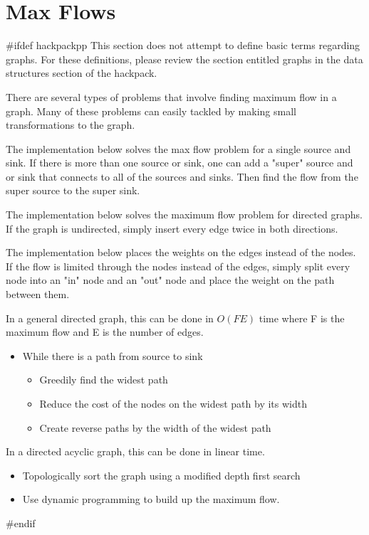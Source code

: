 \section{Max Flows}
#ifdef hackpackpp
This section does not attempt to define basic terms regarding graphs.
For these definitions, please review the section entitled graphs in the data structures section of the hackpack.


There are several types of problems that involve finding maximum flow in a graph.
Many of these problems can easily tackled by making small transformations to the graph.


The implementation below solves the max flow problem for a single source and sink.
If there is more than one source or sink, one can add a "super" source and or sink that connects to all of the sources and sinks.
Then find the flow from the super source to the super sink.


The implementation below solves the maximum flow problem for directed graphs.
If the graph is undirected, simply insert every edge twice in both directions.


The implementation below places the weights on the edges instead of the nodes.
If the flow is limited through the nodes instead of the edges, simply split every node into an "in" node and an "out" node and place the weight on the path between them.


In a general directed graph, this can be done in $O(FE)$ time where F is the maximum flow and E is the number of edges.
\begin{itemize}
	\item While there is a path from source to sink
	\begin{itemize}
		\item Greedily find the widest path
		\item Reduce the cost of the nodes on the widest path by its width
		\item Create reverse paths by the width of the widest path
	\end{itemize}
\end{itemize}

In a directed acyclic graph, this can be done in linear time.

\begin{itemize}
	\item Topologically sort the graph using a modified depth first search
	\item Use dynamic programming to build up the maximum flow.
\end{itemize}
#endif

